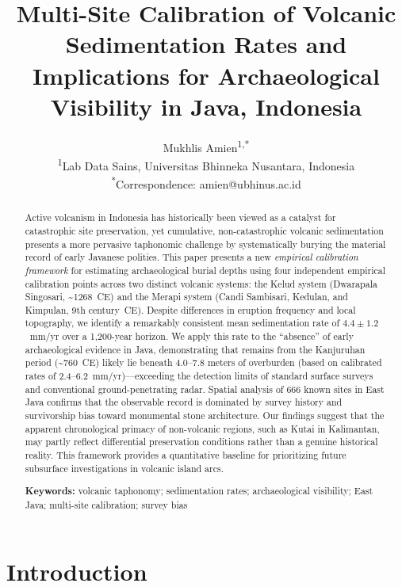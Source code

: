 \documentclass[12pt,a4paper]{article}
\title{Multi-Site Calibration of Volcanic Sedimentation Rates and Implications for Archaeological Visibility in Java, Indonesia}
\author{
  Mukhlis Amien\textsuperscript{1,*}\\[6pt]
  \small \textsuperscript{1}Lab Data Sains, Universitas Bhinneka Nusantara, Indonesia\\
  \small \textsuperscript{*}Correspondence: amien@ubhinus.ac.id
}
\date{}
\begin{document}
\maketitle

\begin{abstract}
Active volcanism in Indonesia has historically been viewed as a catalyst for catastrophic site preservation, yet cumulative, non-catastrophic volcanic sedimentation presents a more pervasive taphonomic challenge by systematically burying the material record of early Javanese polities. This paper presents a new \textit{empirical calibration framework} for estimating archaeological burial depths using four independent empirical calibration points across two distinct volcanic systems: the Kelud system (Dwarapala Singosari, \textasciitilde1268~CE) and the Merapi system (Candi Sambisari, Kedulan, and Kimpulan, 9th century~CE). Despite differences in eruption frequency and local topography, we identify a remarkably consistent mean sedimentation rate of $4.4 \pm 1.2$~mm/yr over a 1,200-year horizon. We apply this rate to the ``absence'' of early archaeological evidence in Java, demonstrating that remains from the Kanjuruhan period (\textasciitilde760~CE) likely lie beneath 4.0--7.8 meters of overburden (based on calibrated rates of 2.4--6.2~mm/yr)---exceeding the detection limits of standard surface surveys and conventional ground-penetrating radar. Spatial analysis of 666 known sites in East Java confirms that the observable record is dominated by survey history and survivorship bias toward monumental stone architecture. Our findings suggest that the apparent chronological primacy of non-volcanic regions, such as Kutai in Kalimantan, may partly reflect differential preservation conditions rather than a genuine historical reality. This framework provides a quantitative baseline for prioritizing future subsurface investigations in volcanic island arcs.

\medskip
\noindent\textbf{Keywords:} volcanic taphonomy; sedimentation rates; archaeological visibility; East Java; multi-site calibration; survey bias
\end{abstract}

\section{Introduction}
\end{document}
